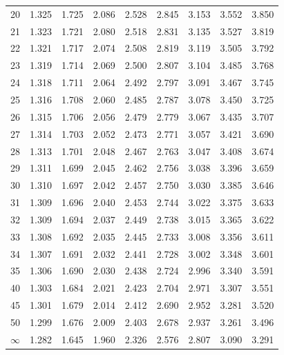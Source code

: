 \documentclass[
]{book}
\theoremstyle{definition}
\theoremstyle{definition}
\theoremstyle{definition}
\theoremstyle{definition}
\theoremstyle{remark}
\begin{document}
\begin{longtable}[]{@{}rcccccccc@{}}
20 & 1.325 & 1.725 & 2.086 & 2.528 & 2.845 & 3.153 & 3.552 & 3.850 \\
21 & 1.323 & 1.721 & 2.080 & 2.518 & 2.831 & 3.135 & 3.527 & 3.819 \\
22 & 1.321 & 1.717 & 2.074 & 2.508 & 2.819 & 3.119 & 3.505 & 3.792 \\
23 & 1.319 & 1.714 & 2.069 & 2.500 & 2.807 & 3.104 & 3.485 & 3.768 \\
24 & 1.318 & 1.711 & 2.064 & 2.492 & 2.797 & 3.091 & 3.467 & 3.745 \\
25 & 1.316 & 1.708 & 2.060 & 2.485 & 2.787 & 3.078 & 3.450 & 3.725 \\
26 & 1.315 & 1.706 & 2.056 & 2.479 & 2.779 & 3.067 & 3.435 & 3.707 \\
27 & 1.314 & 1.703 & 2.052 & 2.473 & 2.771 & 3.057 & 3.421 & 3.690 \\
28 & 1.313 & 1.701 & 2.048 & 2.467 & 2.763 & 3.047 & 3.408 & 3.674 \\
29 & 1.311 & 1.699 & 2.045 & 2.462 & 2.756 & 3.038 & 3.396 & 3.659 \\
30 & 1.310 & 1.697 & 2.042 & 2.457 & 2.750 & 3.030 & 3.385 & 3.646 \\
31 & 1.309 & 1.696 & 2.040 & 2.453 & 2.744 & 3.022 & 3.375 & 3.633 \\
32 & 1.309 & 1.694 & 2.037 & 2.449 & 2.738 & 3.015 & 3.365 & 3.622 \\
33 & 1.308 & 1.692 & 2.035 & 2.445 & 2.733 & 3.008 & 3.356 & 3.611 \\
34 & 1.307 & 1.691 & 2.032 & 2.441 & 2.728 & 3.002 & 3.348 & 3.601 \\
35 & 1.306 & 1.690 & 2.030 & 2.438 & 2.724 & 2.996 & 3.340 & 3.591 \\
40 & 1.303 & 1.684 & 2.021 & 2.423 & 2.704 & 2.971 & 3.307 & 3.551 \\
45 & 1.301 & 1.679 & 2.014 & 2.412 & 2.690 & 2.952 & 3.281 & 3.520 \\
50 & 1.299 & 1.676 & 2.009 & 2.403 & 2.678 & 2.937 & 3.261 & 3.496 \\
\(\infty\) & 1.282 & 1.645 & 1.960 & 2.326 & 2.576 & 2.807 & 3.090 & 3.291 \\
\bottomrule
\end{longtable}
\end{document}
